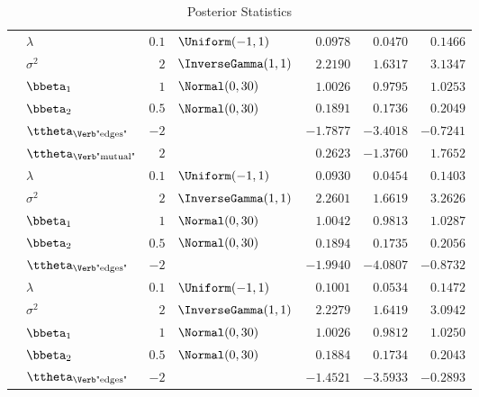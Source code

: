 \begin{table}[t]
\begin{tabular}{cl|rlrrr}
        & $\lambda$                        & $0.1$ & $\Uniform(-1,1)$       & $0.0978$  & $0.0470$  & $0.1466$  \\
        & $\sigma^2$                       & $2$   & $\InverseGamma(1,1)$   & $2.2190$  & $1.6317$  & $3.1347$  \\
        & $\bbeta_{1}$                     & $1$   & $\Normal(0,30)$        & $1.0026$  & $0.9795$  & $1.0253$  \\
        & $\bbeta_{2}$                     & $0.5$ & $\Normal(0,30)$        & $0.1891$  & $0.1736$  & $0.2049$  \\
        & $\ttheta_{\text{\Verb"edges"}}$  & $-2$  &   & $-1.7877$ & $-3.4018$ & $-0.7241$ \\
        & $\ttheta_{\text{\Verb"mutual"}}$ & $2$   &   & $0.2623$  & $-1.3760$ & $1.7652$  \\
		\midrule
        & $\lambda$                        & $0.1$ & $\Uniform(-1,1)$       & $0.0930$  & $0.0454$  & $0.1403$  \\
        & $\sigma^2$                       & $2$   & $\InverseGamma(1,1)$   & $2.2601$  & $1.6619$  & $3.2626$  \\
        & $\bbeta_{1}$                     & $1$   & $\Normal(0,30)$        & $1.0042$  & $0.9813$  & $1.0287$  \\
        & $\bbeta_{2}$                     & $0.5$ & $\Normal(0,30)$        & $0.1894$  & $0.1735$  & $0.2056$  \\
        & $\ttheta_{\text{\Verb"edges"}}$  & $-2$  &   & $-1.9940$ & $-4.0807$ & $-0.8732$ \\
		\midrule
        & $\lambda$                        & $0.1$ & $\Uniform(-1,1)$       & $0.1001$  & $0.0534$  & $0.1472$  \\
        & $\sigma^2$                       & $2$   & $\InverseGamma(1,1)$   & $2.2279$  & $1.6419$  & $3.0942$  \\
        & $\bbeta_{1}$                     & $1$   & $\Normal(0,30)$        & $1.0026$  & $0.9812$  & $1.0250$  \\
        & $\bbeta_{2}$                     & $0.5$ & $\Normal(0,30)$        & $0.1884$  & $0.1734$  & $0.2043$  \\
        & $\ttheta_{\text{\Verb"edges"}}$  & $-2$  &  & $-1.4521$ & $-3.5933$ & $-0.2893$ \\
		\bottomrule
	\end{tabular}
	\caption{Posterior Statistics}
	\label{tab:P2}
\end{table}
